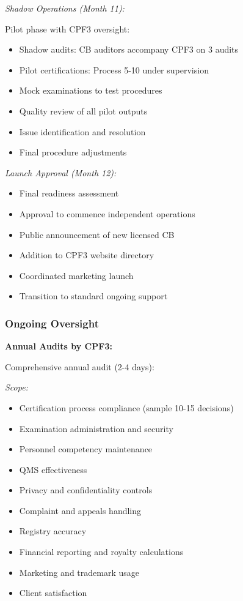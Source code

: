 \documentclass[11pt,a4paper]{article}
\begin{document}
\textit{Shadow Operations (Month 11):}

Pilot phase with CPF3 oversight:
\begin{itemize}
\item Shadow audits: CB auditors accompany CPF3 on 3 audits
\item Pilot certifications: Process 5-10 under supervision
\item Mock examinations to test procedures
\item Quality review of all pilot outputs
\item Issue identification and resolution
\item Final procedure adjustments
\end{itemize}

\textit{Launch Approval (Month 12):}

\begin{itemize}
\item Final readiness assessment
\item Approval to commence independent operations
\item Public announcement of new licensed CB
\item Addition to CPF3 website directory
\item Coordinated marketing launch
\item Transition to standard ongoing support
\end{itemize}

\subsubsection{Ongoing Oversight}

\textbf{Annual Audits by CPF3:}

Comprehensive annual audit (2-4 days):

\textit{Scope:}
\begin{itemize}
\item Certification process compliance (sample 10-15 decisions)
\item Examination administration and security
\item Personnel competency maintenance
\item QMS effectiveness
\item Privacy and confidentiality controls
\item Complaint and appeals handling
\item Registry accuracy
\item Financial reporting and royalty calculations
\item Marketing and trademark usage
\item Client satisfaction
\end{itemize}
\end{document}
